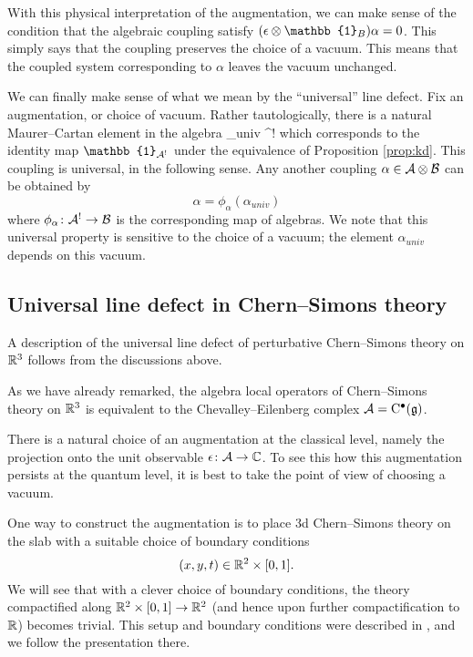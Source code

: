 \documentclass[11pt]{amsart}
\def\id{\mathbb{1}}
\begin{document}
With this physical interpretation of the augmentation, we can make sense of the condition that the algebraic coupling satisfy $(\ep \otimes \id_B) \alpha = 0$.
This simply says that the coupling preserves the choice of a vacuum.
This means that the coupled system corresponding to $\alpha$ leaves the vacuum unchanged.

We can finally make sense of what we mean by the ``universal'' line defect. 
Fix an augmentation, or choice of vacuum. 
Rather tautologically, there is a natural Maurer--Cartan element in the algebra 
\beqn\label{eqn:univ}
\alpha_{univ} \in \cA \otimes \cA^! 
\eeqn
which corresponds to the identity map $\id_{\cA^!}$ under the equivalence of Proposition \ref{prop:kd}. 
This coupling is universal, in the following sense. 
Any another coupling $\alpha \in \mathcal A \otimes \mathcal B$ can be obtained by
\[
\alpha = \phi_\alpha (\alpha_{univ})
\]
where $\phi_\alpha \colon \mathcal A^! \to \mathcal B$ is the corresponding map of algebras. 
We note that this universal property is sensitive to the choice of a vacuum; the element $\alpha_{univ}$ depends on this vacuum.  

\subsection{Universal line defect in Chern--Simons theory} 

A description of the universal line defect of perturbative Chern--Simons theory on $\mathbb R^3$ follows from the discussions above. 

As we have already remarked, the algebra local operators of Chern--Simons theory on $\mathbb R^3$ is equivalent to the Chevalley--Eilenberg complex $\mathcal A = {\rm C}^\bullet(\mathfrak g)$. 

There is a natural choice of an augmentation at the classical level, namely the projection onto the unit observable $\epsilon\colon \mathcal A \to \mathbb C$. 
To see this how this augmentation persists at the quantum level, it is best to take the point of view of choosing a vacuum. 

One way to construct the augmentation is to place 3d Chern--Simons theory on the slab with a suitable choice of boundary conditions
\[
(x,y,t) \in \mathbb R^2 \times [0,1] .
\]
We will see that with a clever choice of boundary conditions, the theory compactified along $\mathbb R^2 \times [0,1] \to \mathbb R^2$ (and hence upon further compactification to $\mathbb R$) becomes trivial. 
This setup and boundary conditions were described in \cite{Aamand}, and we follow the presentation there. 
\end{document}
